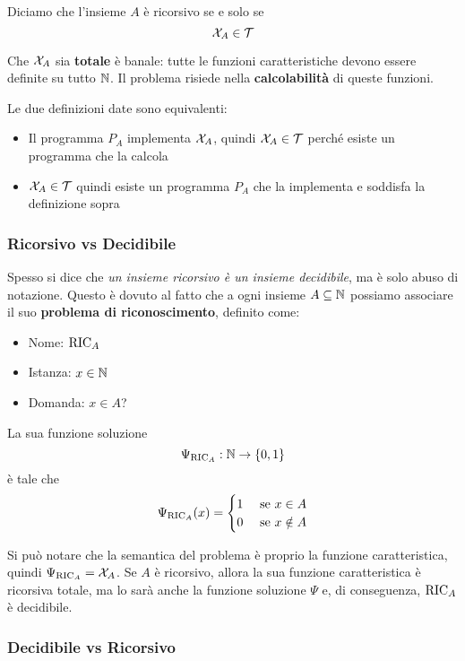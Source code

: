 Diciamo che l'insieme $A$ è ricorsivo se e solo se
$$ \mathcal{X}_A \in \mathcal{T} $$

Che $\mathcal{X}_A$ sia \textbf{totale} è banale: tutte le funzioni caratteristiche devono essere definite su tutto $\mathbb{N}$. Il problema risiede nella \textbf{calcolabilità} di queste funzioni.

Le due definizioni date sono equivalenti:
\begin{itemize}
	\item Il programma $P_A$ implementa $\mathcal{X}_A$, quindi $\mathcal{X}_A \in \mathcal{T}$ perché esiste un programma che la calcola
    
	\item $\mathcal{X}_A \in \mathcal{T}$ quindi esiste un programma $P_A$ che la implementa e soddisfa la definizione sopra
\end{itemize}

\subsubsection{Ricorsivo vs Decidibile}

Spesso si dice che \textit{un insieme ricorsivo è un insieme decidibile}, ma è solo abuso di notazione. Questo è dovuto al fatto che a ogni insieme $A \subseteq \mathbb{N}$ possiamo associare il suo \textbf{problema di riconoscimento}, definito come:
\begin{itemize}
	\item Nome: $\text{RIC}_A$
	
    \item Istanza: $x \in \mathbb{N}$
	
    \item Domanda: $x \in A$?
\end{itemize}

La sua funzione soluzione
$$ \Psi_{\text{RIC}_A} : \mathbb{N} \rightarrow \{0,1\} $$
è tale che
$$
\Psi_{\text{RIC}_A} (x) = \begin{cases}
	1 & \text{ se } x \in A\\
	0 & \text{ se } x \notin A
\end{cases}
$$

Si può notare che la semantica del problema è proprio la funzione caratteristica, quindi $\Psi_{\text{RIC}_A} = \mathcal{X}_A$. Se $A$ è ricorsivo, allora la sua funzione caratteristica è ricorsiva totale, ma lo sarà anche la funzione soluzione $\Psi$ e, di conseguenza, $\text{RIC}_A$ è decidibile.

\subsubsection{Decidibile vs Ricorsivo}

